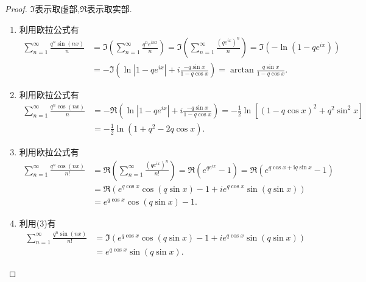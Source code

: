 \documentclass[../../main.tex]{subfiles}
\begin{document}
\begin{proof}
$\Im$表示取虚部,$\Re$表示取实部.
\begin{enumerate}[(1)]
\item 利用欧拉公式有
\begin{align*}
\sum_{n = 1}^{\infty} \frac{q^{n} \sin(nx)}{n} &= \Im\left( \sum_{n = 1}^{\infty} \frac{q^{n} e^{inx}}{n} \right) = \Im\left( \sum_{n = 1}^{\infty} \frac{(q e^{ix})^{n}}{n} \right) = \Im(-\ln(1 - q e^{ix})) \\
&= -\Im\left( \ln|1 - q e^{ix}| + i \frac{-q \sin x}{1 - q \cos x} \right) = \arctan \frac{q \sin x}{1 - q \cos x}.
\end{align*}

\item 利用欧拉公式有
\begin{align*}
\sum_{n = 1}^{\infty} \frac{q^{n} \cos(nx)}{n} &= -\Re\left( \ln|1 - q e^{ix}| + i \frac{-q \sin x}{1 - q \cos x} \right) = -\frac{1}{2} \ln\left[(1 - q \cos x)^{2} + q^{2} \sin^{2} x\right] \\
&= -\frac{1}{2} \ln(1 + q^{2} - 2q \cos x).
\end{align*}

\item 利用欧拉公式有
\begin{align*}
\sum_{n = 1}^{\infty} \frac{q^{n} \cos(nx)}{n!} &= \Re\left( \sum_{n = 1}^{\infty} \frac{(q e^{ix})^{n}}{n!} \right) = \Re\left( e^{q e^{ix}} - 1 \right) =\Re \left( e^{q\cos x+\mathrm{i}q\sin x}-1 \right) 
\\
&= \Re\left( e^{q \cos x} \cos(q \sin x) - 1 + i e^{q \cos x} \sin(q \sin x) \right) \\
&= e^{q \cos x} \cos(q \sin x) - 1.
\end{align*}

\item 利用(3)有
\begin{align*}
\sum_{n = 1}^{\infty} \frac{q^{n} \sin(nx)}{n!} &= \Im\left( e^{q \cos x} \cos(q \sin x) - 1 + i e^{q \cos x} \sin(q \sin x) \right) \\
&= e^{q \cos x} \sin(q \sin x).
\end{align*} 
\end{enumerate}

\end{proof}
\end{document}
